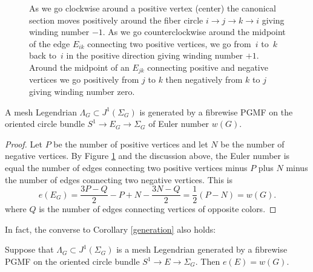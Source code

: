 \begin{figure}[htbp]
\begin{center}
\caption{\smaller As we go clockwise around a positive vertex (center) the canonical section moves positively around the fiber circle $i\to j\to k\to i$ giving winding number $-1$. As we go counterclockwise around the midpoint of the edge $E_{ik}$ connecting two positive vertices, we go from~$i$ to~$k$ back to~$i$ in the positive direction giving winding number $+1$. Around the midpoint of an $E_{jk}$ connecting positive and negative vertices we go positively from $j$ to $k$ then negatively from $k$ to $j$ giving winding number zero.}
\label{Fig: 3 circles}
\end{center}
\end{figure}

\begin{corollary}\label{generation}
A mesh Legendrian $\Lambda_G \subset J^1(\Sigma_G)$ is generated by a fibrewise PGMF on the oriented circle bundle $S^1 \to E_G \to \Sigma_G$ of Euler number $w(G)$.
\end{corollary}

\begin{proof}
Let $P$ be the number of positive vertices and let $N$ be the number of negative vertices. By Figure \ref{Fig: 3 circles} and the discussion above, the Euler number is equal the number of edges connecting two positive vertices minus $P$ plus $N$ minus the number of edges connecting two negative vertices. This is
\[
e(E_G)=\frac{3P-Q}2-P+N-\frac{3N-Q}2=\frac12(P-N)=w(G).
\]
where $Q$ is the number of edges connecting vertices of opposite colors. \end{proof}

In fact, the converse to Corollary \ref{generation} also holds:

\begin{proposition}\label{euler for circle}
Suppose that $\Lambda_G \subset J^1(\Sigma_G)$ is a mesh Legendrian generated by a fibrewise PGMF on the oriented circle bundle $S^1 \to E \to \Sigma_G$. Then $e(E)=w(G)$.
\end{proposition}


